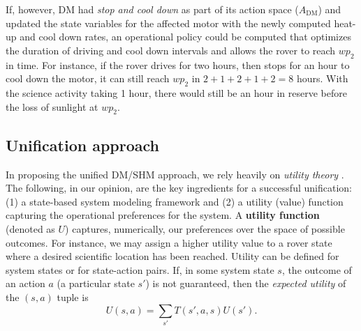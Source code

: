If, however, DM had \textit{stop and cool down} as part of its action space ($A_\text{DM}$) and updated the state variables for the affected motor with the newly computed heat-up and cool down rates, an operational policy could be computed that optimizes the duration of driving and cool down intervals and allows the rover to reach $wp_2$ in time. For instance, if the rover drives for two hours, then stops for an hour to cool down the motor, it can still reach $wp_2$ in $2+1+2+1+2 = 8$ hours. With the science activity taking 1 hour, there would still be an hour in reserve before the loss of sunlight at $wp_2$.

\subsection{Unification approach}
In proposing the unified DM/SHM approach, we rely heavily on \textit{utility theory} \cite{Fishburn1970}. The following, in our opinion, are the key ingredients for a successful  unification: (1) a state-based system modeling framework and (2) a utility (value) function capturing the operational preferences for the system. A \textbf{utility function} (denoted as $U$) captures, numerically, our preferences over the space of possible outcomes. For instance, we may assign a higher utility value to a rover state where a desired scientific location has been reached. Utility can be defined for system states or for state-action pairs. If, in some system state $s$, the outcome of an action $a$ (a particular state $s'$) is not guaranteed, then the \textit{expected utility} of the $(s,a)$ tuple is
\begin{equation}
U(s,a) = \sum_{s'}T(s',a,s)U(s').
\end{equation}

